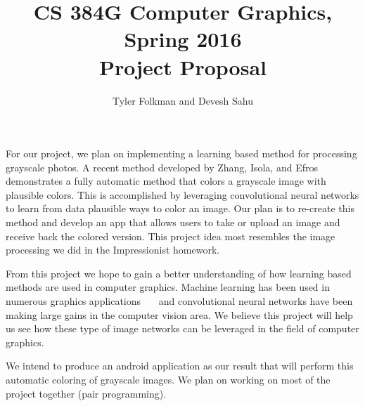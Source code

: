 \documentclass[11pt,letterpaper]{article}
\author{Tyler Folkman and Devesh Sahu}
\title{CS 384G Computer Graphics, Spring 2016 \\ Project Proposal}
\begin{document}
\maketitle

For our project, we plan on implementing a learning based method for processing grayscale photos. A recent method developed by Zhang, Isola, and Efros~\cite{zhang2016colorful} demonstrates a fully automatic method that colors a grayscale image with plausible colors. This is accomplished by leveraging convolutional neural networks to learn from data plausible ways to color an image. Our plan is to re-create this method and develop an app that allows users to take or upload an image and receive back the colored version. This project idea most resembles the image processing we did in the Impressionist homework.

From this project we hope to gain a better understanding of how learning based methods are used in computer graphics. Machine learning has been used in numerous graphics applications~\cite{grochow2004style}~\cite{barbivc2004segmenting}~\cite{matusik2003data} and convolutional neural networks have been making large gains in the computer vision area. We believe this project will help us see how these type of image networks can be leveraged in the field of computer graphics. 

We intend to produce an android application as our result that will perform this automatic coloring of grayscale images. We plan on working on most of the project together (pair programming).






\end{document}
